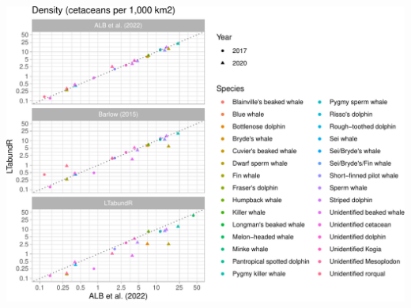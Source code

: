 \documentclass[
]{book}
\begin{document}
\includegraphics{figures/unnamed-chunk-384-1.pdf}

~
\end{document}
